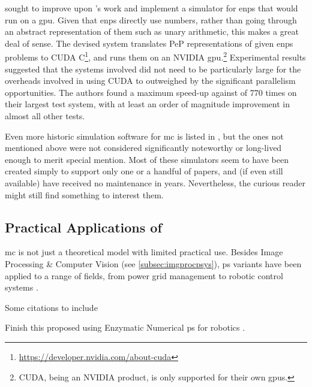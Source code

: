\citeauthor{Raghavan2020} \cite{Raghavan2020} sought to improve upon \citeauthor{Florea2018}'s work \cite{Florea2018} and implement a simulator for \gls{enps} that would run on a \gls{gpu}.  Given that \gls{enps} directly use numbers, rather than going through an abstract representation of them such as unary arithmetic, this makes a great deal of sense.  The devised system translates PeP representations of given \gls{enps} problems to CUDA C\footnote{\url{https://developer.nvidia.com/about-cuda}}, and runs them on an NVIDIA \gls{gpu}.\footnote{CUDA, being an NVIDIA product, is only supported for their own \glspl{gpu}.}  Experimental results suggested that the systems involved did not need to be particularly large for the overheads involved in using CUDA to outweighed by the significant parallelism opportunities.  The authors found a maximum speed-up against \cite{Florea2018} of 770 times on their largest test system, with at least an order of magnitude improvement in almost all other tests.

Even more historic simulation software for \gls{mc} is listed in \cite{Raghavan2016}, but the ones not mentioned above were not considered significantly noteworthy or long-lived enough to merit special mention.  Most of these simulators seem to have been created simply to support only one or a handful of papers, and (if even still available) have received no maintenance in years.  Nevertheless, the curious reader might still find something to interest them.


\subsection{\label{sec:psystemsuses}Practical Applications of }
\Gls{mc} is not just a theoretical model with limited practical use.  Besides Image Processing \& Computer Vision (see \vref{subsec:imgprocpsys}), \gls{ps} variants have been applied to a range of fields, from power grid management to robotic control systems \cite{Zhang2017}.

\begin{anfxwarning}{Some citations to include}
\cite{Zhang2020,Colomer2010,Gheorghe2010,Liu2016,Huang2016,Perez-Hurtado2010,Verlan2012,Syropoulos2004,Liu2020,Lefticaru2011,Oltean2008}
\end{anfxwarning}

\begin{anfxerror}{Finish this}
\citeauthor{Florea2017} proposed using Enzymatic Numerical \gls{ps} for robotics \cite{Florea2017,Florea2016,Florea2017a,Florea2019,Florea2016a}.
\end{anfxerror}

